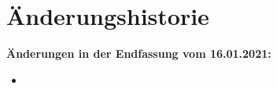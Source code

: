 \section{Änderungshistorie}

\textbf{Änderungen in der Endfassung vom 16.01.2021:}

\begin{itemize}
    \item
\end{itemize}
